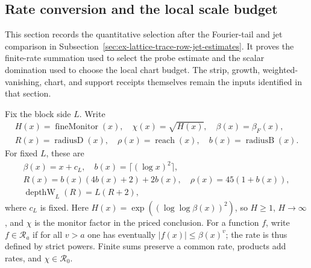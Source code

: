 \subsection{Rate conversion and the local scale budget}
\label{sec:ex-lattice-trace-local-rate-selection}

This section records the quantitative selection after the Fourier-tail and
jet comparison in Subsection~\ref{sec:ex-lattice-trace-row-jet-estimates}.
It proves the finite-rate summation used to select the probe estimate and the
scalar domination used to choose the local chart budget. The strip, growth,
weighted-vanishing, chart, and support receipts themselves remain the inputs
identified in that section.

Fix the block side \(L\). Write
\[
 \begin{gathered}
 H(x)=\operatorname{fineMonitor}(x),\quad \chi(x)=\sqrt{H(x)},\quad
 \beta(x)=\beta_F(x),\\
 R(x)=\operatorname{radiusD}(x),\quad
 \rho(x)=\operatorname{reach}(x),\quad b(x)=\operatorname{radiusB}(x).
 \end{gathered}
\]
For fixed \(L\), these are
\[
 \begin{gathered}
 \beta(x)=x+c_L,\quad b(x)=\lceil(\log x)^2\rceil,\\
 R(x)=b(x)(4b(x)+2)+2b(x),\quad \rho(x)=45(1+b(x)),\\
 \operatorname{depthW}_L(R)=L(R+2),
 \end{gathered}
\]
where \(c_L\) is fixed. Here \(H(x)=\exp((\log\log\beta(x))^2)\), so \(H\ge1\),
\(H\to\infty\), and \(\chi\) is the monitor factor in the priced
conclusion. For a function \(f\), write \(f\in\mathcal R_a\) if for
all \(v>a\) one has eventually \(|f(x)|\le\beta(x)^v\); the rate is thus
defined by strict powers. Finite sums preserve a common rate,
products add rates, and \(\chi\in\mathcal R_0\).

